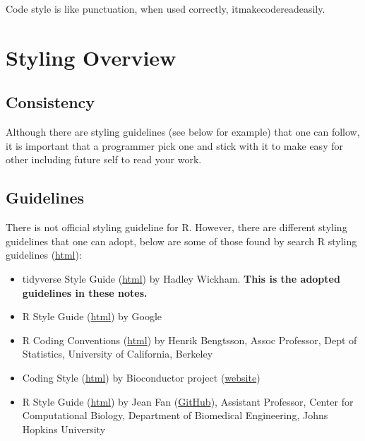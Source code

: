 \documentclass[
  letterpaper,
  DIV=11,
  numbers=noendperiod]{scrreprt}
\providecommand{\tightlist}{%
  \setlength{\itemsep}{0pt}\setlength{\parskip}{0pt}}\usepackage{longtable,booktabs,array}
\begin{document}
\begin{tcolorbox}[enhanced jigsaw, opacityback=0, title=\textcolor{quarto-callout-note-color}{\faInfo}\hspace{0.5em}{Code Style \& Punctuation}, colback=white, leftrule=.75mm, colbacktitle=quarto-callout-note-color!10!white, bottomrule=.15mm, colframe=quarto-callout-note-color-frame, arc=.35mm, bottomtitle=1mm, coltitle=black, toptitle=1mm, toprule=.15mm, opacitybacktitle=0.6, rightrule=.15mm, titlerule=0mm, breakable, left=2mm]

Code style is like punctuation, when used correctly,
itmakecodereadeasily.

\end{tcolorbox}

\section{Styling Overview}\label{styling-overview}

\subsection{Consistency}\label{consistency}

Although there are styling guidelines (see below for example) that one
can follow, it is important that a programmer pick one and stick with it
to make easy for other including future self to read your work.

\subsection{Guidelines}\label{guidelines}

There is not official styling guideline for R. However, there are
different styling guidelines that one can adopt, below are some of those
found by search R styling guidelines
(\href{https://www.google.com/search?q=r+styling+guidlines&oq=r+styling+guidlines}{html}):

\begin{itemize}
\tightlist
\item
  tidyverse Style Guide (\href{https://style.tidyverse.org/}{html}) by
  Hadley Wickham. \textbf{This is the adopted guidelines in these
  notes.}
\item
  R Style Guide
  (\href{https://google.github.io/styleguide/Rguide.html}{html}) by
  Google
\item
  R Coding Conventions
  (\href{https://docs.google.com/document/d/1esDVxyWvH8AsX-VJa-8oqWaHLs4stGlIbk8kLc5VlII/preview}{html})
  by Henrik Bengtsson, Assoc Professor, Dept of Statistics, University
  of California, Berkeley
\item
  Coding Style
  (\href{https://contributions.bioconductor.org/r-code.html\#r-code}{html})
  by Bioconductor project (\href{https://bioconductor.org/}{website})
\item
  R Style Guide (\href{https://jef.works/R-style-guide/}{html}) by Jean
  Fan (\href{https://github.com/JEFworks}{GitHub}), Assistant Professor,
  Center for Computational Biology, Department of Biomedical
  Engineering, Johns Hopkins University
\end{itemize}
\end{document}
